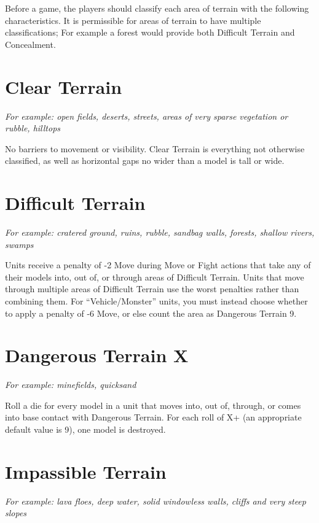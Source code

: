 \begin{multicols}{2}
Before a game, the players should classify each area of terrain with the following characteristics. It is permissible for areas of terrain to have multiple classifications; For example a forest would provide both Difficult Terrain and Concealment.




\section*{Clear Terrain}
\textit{For example: open fields, deserts, streets, areas of very sparse vegetation or rubble, hilltops}

No barriers to movement or visibility. Clear Terrain is everything not otherwise classified, as well as horizontal gaps no wider than a model is tall or wide.




\section*{Difficult Terrain}
\textit{For example: cratered ground, ruins, rubble, sandbag walls, forests, shallow rivers, swamps}

Units receive a penalty of -2 Move during Move or Fight actions that take any of their models into, out of, or through areas of Difficult Terrain. Units that move through multiple areas of Difficult Terrain use the worst penalties rather than combining them. For ``Vehicle/Monster'' units, you must instead choose whether to apply a penalty of -6 Move, or else count the area as Dangerous Terrain 9.




\section*{Dangerous Terrain X}
\textit{For example: minefields, quicksand}

Roll a die for every model in a unit that moves into, out of, through, or comes into base contact with Dangerous Terrain. For each roll of X+ (an appropriate default value is 9), one model is destroyed.




\section*{Impassible Terrain}
\textit{For example: lava floes, deep water, solid windowless walls, cliffs and very steep slopes}


\end{multicols}

